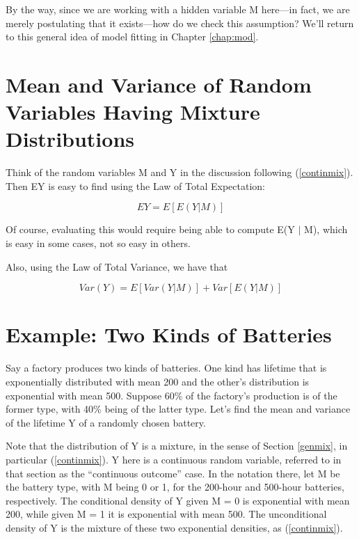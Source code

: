 By the way, since we are working with a hidden variable M here---in
fact, we are merely postulating that it exists---how do we check this
assumption?  We'll return to this general idea of model fitting in
Chapter \ref{chap:mod}.

\section{Mean and Variance of Random Variables Having Mixture
Distributions}
\label{mixmeanvar}

Think of the random variables M and Y in the discussion following
(\ref{continmix}).  Then EY is easy to find using the Law of Total
Expectation:

\begin{equation}
\label{mixmean}
EY = E[E(Y | M)]
\end{equation}

Of course, evaluating this would require being able to compute E(Y $|$
M), which is easy in some cases, not so easy in others.

Also, using the Law of Total Variance, we have that

\begin{equation}
\label{mixvar}
Var(Y) = E[Var(Y|M)] + Var[E(Y|M)]
\end{equation}

\section{Example:  Two Kinds of Batteries}

Say a factory produces two kinds of batteries.  One kind has lifetime
that is exponentially distributed with mean 200 and the other's
distribution is exponential with mean 500.  Suppose 60\% of the
factory's production is of the former type, with 40\% being of the
latter type.  Let's find the mean and variance of the lifetime Y of a
randomly chosen battery.

Note that the distribution of Y is a mixture, in the sense of Section
\ref{genmix}, in particular (\ref{continmix}).  Y here is a continuous
random variable, referred to in that section as the ``continuous
outcome'' case.   In the notation there, let M be the battery type, with
M being 0 or 1, for the 200-hour and 500-hour batteries, respectively.
The conditional density of Y given M = 0 is exponential with mean 200,
while given M = 1 it is exponential with mean 500.  The unconditional
density of Y is the mixture of these two exponential densities, as 
(\ref{continmix}).

